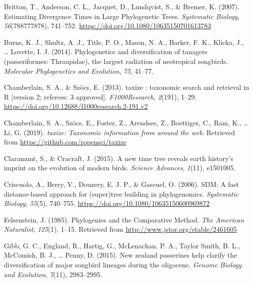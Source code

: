 \documentclass[
  english,
  man]{apa6}
\newlength{\cslhangindent}
\newlength{\cslentryspacingunit} %
\newenvironment{CSLReferences}[2] %
 {%
  \setlength{\parindent}{0pt}
  \ifodd #1
  \let\oldpar\par
  \def\par{\hangindent=\cslhangindent\oldpar}
  \fi
  \setlength{\parskip}{#2\cslentryspacingunit}
 }%
 {}
\begin{document}
\begin{CSLReferences}{1}{0}
\leavevmode{}%
Britton, T., Anderson, C. L., Jacquet, D., Lundqvist, S., \& Bremer, K. (2007). {Estimating Divergence Times in Large Phylogenetic Trees}. \emph{Systematic Biology}, \emph{56}(788777878), 741--752. \url{https://doi.org/10.1080/10635150701613783}

\leavevmode{}%
Burns, K. J., Shultz, A. J., Title, P. O., Mason, N. A., Barker, F. K., Klicka, J., \ldots{} Lovette, I. J. (2014). Phylogenetics and diversification of tanagers (passeriformes: Thraupidae), the largest radiation of neotropical songbirds. \emph{Molecular Phylogenetics and Evolution}, \emph{75}, 41--77.

\leavevmode{}%
Chamberlain, S. A., \& Szöcs, E. (2013). {taxize : taxonomic search and retrieval in R {[}version 2; referees: 3 approved{]}}. \emph{F1000Research}, \emph{2}(191), 1--29. \url{https://doi.org/10.12688/f1000research.2-191.v2}

\leavevmode{}%
Chamberlain, S. A., Szöcs, E., Foster, Z., Arendsee, Z., Boettiger, C., Ram, K., \ldots{} Li, G. (2019). \emph{{taxize: Taxonomic information from around the web}}. Retrieved from \url{https://github.com/ropensci/taxize}

\leavevmode{}%
Claramunt, S., \& Cracraft, J. (2015). A new time tree reveals earth history's imprint on the evolution of modern birds. \emph{Science Advances}, \emph{1}(11), e1501005.

\leavevmode{}%
Criscuolo, A., Berry, V., Douzery, E. J. P., \& Gascuel, O. (2006). {SDM: A fast distance-based approach for (super)tree building in phylogenomics}. \emph{Systematic Biology}, \emph{55}(5), 740--755. \url{https://doi.org/10.1080/10635150600969872}

\leavevmode{}%
Felsenstein, J. (1985). {Phylogenies and the Comparative Method}. \emph{The American Naturalist}, \emph{125}(1), 1--15. Retrieved from \url{http://www.jstor.org/stable/2461605}

\leavevmode{}%
Gibb, G. C., England, R., Hartig, G., McLenachan, P. A., Taylor Smith, B. L., McComish, B. J., \ldots{} Penny, D. (2015). New zealand passerines help clarify the diversification of major songbird lineages during the oligocene. \emph{Genome Biology and Evolution}, \emph{7}(11), 2983--2995.


\end{CSLReferences}
\end{document}
